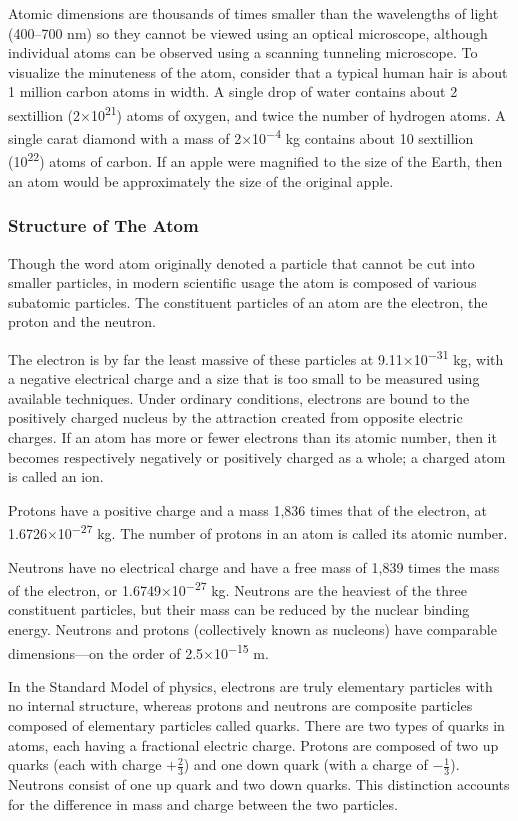 Atomic dimensions are thousands of times smaller than the wavelengths of
light (400--700 nm) so they cannot be viewed using an optical
microscope, although individual atoms can be observed using a scanning
tunneling microscope. To visualize the minuteness of the atom, consider
that a typical human hair is about 1 million carbon atoms in width. A
single drop of water contains about 2 sextillion
(2×10\textsuperscript{21}) atoms of oxygen, and twice the number of
hydrogen atoms. A single carat diamond with a mass of
2×10\textsuperscript{−4} kg contains about 10 sextillion
(10\textsuperscript{22}) atoms of carbon. If an apple were magnified to
the size of the Earth, then an atom would be approximately the size of
the original apple.

\hypertarget{structure-of-the-atom}{%
\subsubsection{Structure of The Atom}\label{structure-of-the-atom}}

Though the word atom originally denoted a particle that cannot be cut
into smaller particles, in modern scientific usage the atom is composed
of various subatomic particles. The constituent particles of an atom are
the electron, the proton and the neutron.

The electron is by far the least massive of these particles at
9.11×10\textsuperscript{−31} kg, with a negative electrical charge and a
size that is too small to be measured using available techniques. Under
ordinary conditions, electrons are bound to the positively charged
nucleus by the attraction created from opposite electric charges. If an
atom has more or fewer electrons than its atomic number, then it becomes
respectively negatively or positively charged as a whole; a charged atom
is called an ion.

Protons have a positive charge and a mass 1,836 times that of the
electron, at 1.6726×10\textsuperscript{−27} kg. The number of protons in
an atom is called its atomic number.

Neutrons have no electrical charge and have a free mass of 1,839 times
the mass of the electron, or 1.6749×10\textsuperscript{−27} kg. Neutrons
are the heaviest of the three constituent particles, but their mass can
be reduced by the nuclear binding energy. Neutrons and protons
(collectively known as nucleons) have comparable dimensions---on the
order of 2.5×10\textsuperscript{−15} m.

In the Standard Model of physics, electrons are truly elementary
particles with no internal structure, whereas protons and neutrons are
composite particles composed of elementary particles called quarks.
There are two types of quarks in atoms, each having a fractional
electric charge. Protons are composed of two up quarks (each with charge
\(+\frac{2}{3}\)) and one down quark (with a charge of
\(−\frac{1}{3}\)). Neutrons consist of one up quark and two down quarks.
This distinction accounts for the difference in mass and charge between
the two particles.

